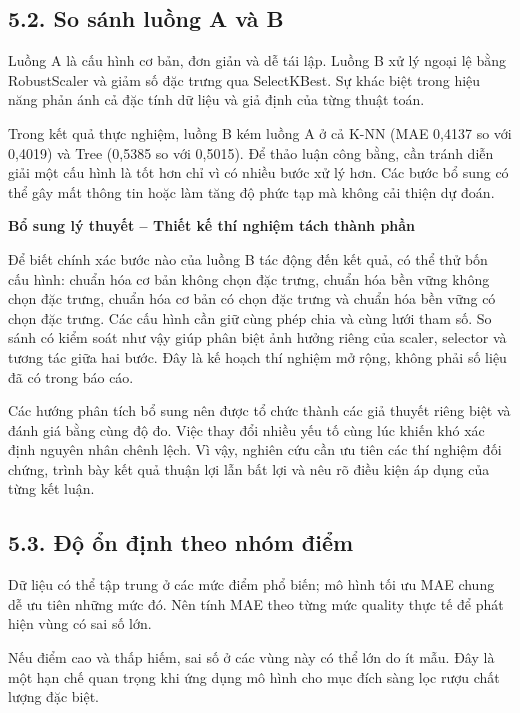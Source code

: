 \documentclass[12pt,a4paper,oneside]{article}
\begin{document}
\subsection*{5.2. So sánh luồng A và B}

Luồng A là cấu hình cơ bản, đơn giản và dễ tái lập. Luồng B xử lý ngoại
lệ bằng RobustScaler và giảm số đặc trưng qua SelectKBest. Sự khác biệt
trong hiệu năng phản ánh cả đặc tính dữ liệu và giả định của từng thuật
toán.

Trong kết quả thực nghiệm, luồng B kém luồng A ở cả K-NN (MAE 0,4137 so
với 0,4019) và Tree (0,5385 so với 0,5015). Để thảo luận công bằng, cần
tránh diễn giải một cấu hình là tốt hơn chỉ vì có nhiều bước xử lý hơn.
Các bước bổ sung có thể gây mất thông tin hoặc làm tăng độ phức tạp mà
không cải thiện dự đoán.


\par\noindent\textbf{Bổ sung lý thuyết -- Thiết kế thí nghiệm tách thành phần}\par
Để biết chính xác bước nào của luồng B tác động đến kết quả, có thể thử bốn cấu hình: chuẩn hóa cơ bản không chọn đặc trưng, chuẩn hóa bền vững không chọn đặc trưng, chuẩn hóa cơ bản có chọn đặc trưng và chuẩn hóa bền vững có chọn đặc trưng. Các cấu hình cần giữ cùng phép chia và cùng lưới tham số. So sánh có kiểm soát như vậy giúp phân biệt ảnh hưởng riêng của scaler, selector và tương tác giữa hai bước. Đây là kế hoạch thí nghiệm mở rộng, không phải số liệu đã có trong báo cáo.\par

Các hướng phân tích bổ sung nên được tổ chức thành các giả thuyết riêng biệt và đánh giá bằng cùng độ đo. Việc thay đổi nhiều yếu tố cùng lúc khiến khó xác định nguyên nhân chênh lệch. Vì vậy, nghiên cứu cần ưu tiên các thí nghiệm đối chứng, trình bày kết quả thuận lợi lẫn bất lợi và nêu rõ điều kiện áp dụng của từng kết luận.\par

\subsection*{5.3. Độ ổn định theo nhóm điểm}

Dữ liệu có thể tập trung ở các mức điểm phổ biến; mô hình tối ưu MAE
chung dễ ưu tiên những mức đó. Nên tính MAE theo từng mức quality thực
tế để phát hiện vùng có sai số lớn.

Nếu điểm cao và thấp hiếm, sai số ở các vùng này có thể lớn do ít mẫu.
Đây là một hạn chế quan trọng khi ứng dụng mô hình cho mục đích sàng lọc
rượu chất lượng đặc biệt.
\end{document}
